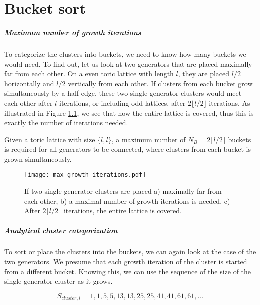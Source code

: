 \chapter{Bucket sort}\label{ap.bucketsort}

\paragraph{Maximum number of growth iterations}
To categorize the clusters into buckets, we need to know how many buckets we would need. To find out, let us look at two generators that are placed maximally far from each other. On a even toric lattice with length $l$, they are placed $l/2$ horizontally and $l/2$ vertically from each other. If clusters from each bucket grow simultaneously by a half-edge, these two single-generator clusters would meet each other after $l$ iterations, or including odd lattices, after $2\lfloor l/2 \rfloor$ iterations. As illustrated in Figure \ref{3.fig.maxgrowthit}, we see that now the entire lattice is covered, thus this is exactly the number of iterations needed.

\begin{lemma}
  Given a toric lattice with size $\{l,l\}$, a maximum number of $N_B = 2\lfloor l/2 \rfloor$ buckets is required for all generators to be connected, where clusters from each bucket is grown simultaneously.
\end{lemma}

\begin{figure}[htpb]
  \centering
  \texttt{[image: max\_growth\_iterations.pdf]}
  \caption{If two single-generator clusters are placed a) maximally far from each other, b) a maximal number of growth iterations is needed. c) After $2\lfloor l/2 \rfloor$ iterations, the entire lattice is covered.}\label{3.fig.maxgrowthit}
\end{figure}

\paragraph{Analytical cluster categorization}
To sort or place the clusters into the buckets, we can again look at the case of the two generators. We presume that each growth iteration of the cluster is started from a different bucket. Knowing this, we can use the sequence of the size of the single-generator cluster as it grows.

\begin{equation}\label{3.eq.sequence}
  S_{cluster, i} = 1, 1, 5, 5, 13, 13, 25, 25, 41, 41, 61, 61, ...
\end{equation}

